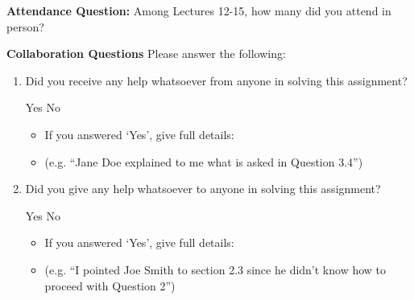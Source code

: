 \textbf{Attendance Question:} Among Lectures 12-15, how many did you attend in person?

\begin{tcolorbox}[fit,height=1cm,blank, borderline={1pt}{-2pt},nobeforeafter]
\end{tcolorbox}



\textbf{Collaboration Questions} Please answer the following:

\begin{enumerate}
    \item Did you receive any help whatsoever from anyone in solving this assignment?
          \begin{checkboxes}
              \choice Yes
              \choice No
          \end{checkboxes}
          \begin{itemize}
              \item If you answered `Yes', give full details:
              \item (e.g. “Jane Doe explained to me what is asked in Question 3.4”)
          \end{itemize}

          \begin{tcolorbox}[fit,height=3cm,blank, borderline={1pt}{-2pt},nobeforeafter]
          \end{tcolorbox}

    \item Did you give any help whatsoever to anyone in solving this assignment?
          \begin{checkboxes}
              \choice Yes
              \choice No
          \end{checkboxes}
          \begin{itemize}
              \item If you answered `Yes', give full details:
              \item (e.g. “I pointed Joe Smith to section 2.3 since he didn’t know how to proceed with Question 2”)
          \end{itemize}

          \begin{tcolorbox}[fit,height=3cm,blank, borderline={1pt}{-2pt},nobeforeafter]
          \end{tcolorbox}


\end{enumerate}
